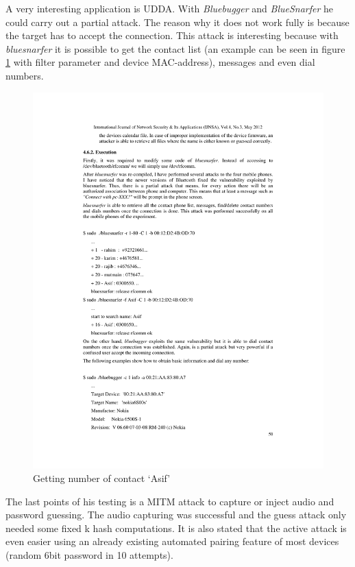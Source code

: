 \documentclass[12pt,a4paper]{article}
\begin{document}
A very interesting application is UDDA. With \emph{Bluebugger} and \emph{BlueSnarfer} he could carry out a partial attack. The reason why it does not work fully is because the target has to accept the connection. This attack is interesting because with \emph{bluesnarfer} it is possible to get the contact list (an example can be seen in figure \ref{img_bt_attack_bluesnarfer} with filter parameter and device MAC-address), messages and even dial numbers.
\begin{figure}[h]
\begin{center}
\includegraphics{img/bluesnarfer.pdf}
\caption{Getting number of contact `Asif'  \cite{DBLP:journals/corr/abs-1206-1482}}
\label{img_bt_attack_bluesnarfer}
\end{center}
\end{figure}
The last points of his testing is a MITM attack to capture or inject audio and password guessing. The audio capturing was successful and the guess attack only needed some fixed k hash computations. It is also stated that the active attack is even easier using an already existing automated pairing feature of most devices (random 6bit password in 10 attempts).
\end{document}
